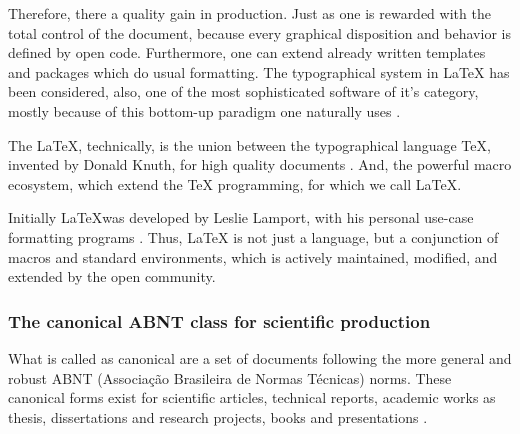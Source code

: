 \documentclass[
12pt,				%
openright,			%
oneside,			%
a4paper,			%
brazil,				%
english,			%
]{abntex2}
\begin{document}
Therefore, there a quality gain in production. Just as one is rewarded
with the total control of the document, because every graphical
disposition and behavior is defined by open code. Furthermore, one can
extend already written templates and packages which do usual
formatting. The typographical system in \LaTeX{} has been considered,
also, one of the most sophisticated software of it's category, mostly
because of this bottom-up paradigm one naturally uses \cite{haralambous2007}.

The \LaTeX{}, technically, is the union between the typographical
language \TeX{}, invented by Donald Knuth, for high quality documents
\cite{knuth1986}. And, the powerful macro ecosystem, which extend the \TeX{}
programming, for which we call \LaTeX{}.

Initially \LaTeX was developed by Leslie Lamport, with his personal
use-case formatting programs \cite{lamport1994}. Thus, \LaTeX{} is not
just a language, but a conjunction of macros and standard
environments, which is actively maintained, modified, and extended by
the open community.

\subsubsection{The canonical ABNT class for scientific production}

What is called as canonical are a set of documents following the more
general and robust ABNT (Associação Brasileira de Normas Técnicas)
norms. These canonical forms exist for scientific articles, technical
reports, academic works as thesis, dissertations and research
projects, books and presentations \cite{abntex2012}. 
\end{document}
